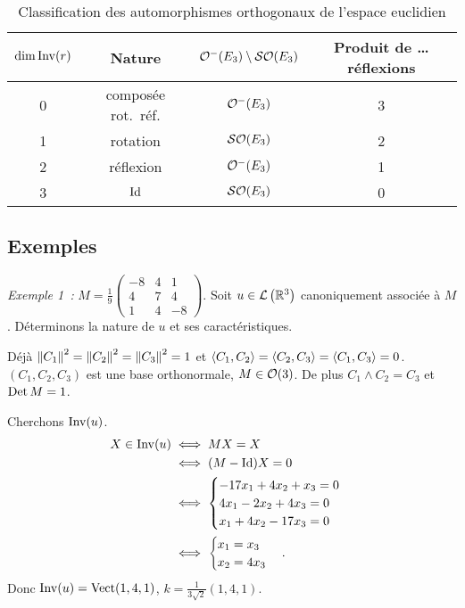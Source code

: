 \begin{table}
  \centering
  \begin{tabular}{|c|c|c|c|}\hline
    \(\operatorname{dim}\operatorname{Inv}(r)\) & Nature & \(\mathcal{O}^{-}\!\left(E_3\right)\setminus\mathcal{SO}\!\left(E_3\right)\) & Produit 
    de \ldots réflexions \\ \hline
    0 & composée rot.\ réf. & \(\mathcal{O}^{-}\!\left(E_3\right)\) & 3 \\
    1 & rotation & \(\mathcal{SO}\!\left(E_3\right)\) & 2 \\
    2 & réflexion & \(\mathcal{O}^{-}\!\left(E_3\right)\) & 1 \\
    3 & \(\operatorname{Id}\) & \(\mathcal{SO}\!\left(E_3\right)\) & 0 \\ \hline
  \end{tabular}
  \caption{Classification des automorphismes orthogonaux de l'espace 
  euclidien}
  \label{tab:classE3}
\end{table}

\subsection{Exemples}

\emph{Exemple 1~:} \(M = \frac{1}{9} \begin{pmatrix} -8 & 4 & 1 \\ 4 & 7 & 4 
\\ 1 & 4 & -8 \end{pmatrix}\). Soit \(u \in \mathcal{L}\left(\mathbb{R}^3\right)\) canoniquement 
associée à \(M\). Déterminons la nature de \(u\) et ses caractéristiques.

Déjà \(\left\lVert C_1\right\rVert^2=\left\lVert C_2\right\rVert^2=\left\lVert C_3\right\rVert^2=1\) et 
\(\left\langle{C_1},{C_2}\right\rangle=\left\langle{C_2},{C_3}\right\rangle=\left\langle{C_1},{C_3}\right\rangle=0\). \((C_1, 
C_2, C_3)\) est une base orthonormale, \(M \in \mathcal{O}\!\left(3\right)\). De plus \(C_1 
\wedge C_2=C_3\) et \(\operatorname{Det} M=1\).

Cherchons \(\operatorname{Inv}(u)\).
\begin{align*}
  X \in \operatorname{Inv}(u) &\iff MX = X \\
  &\iff (M-\operatorname{Id})X =0 \\
  &\iff \begin{cases} -17x_1 +4x_2 +x_3 =0 \\ 4x_1 -2x_2 +4x_3=0 \\ x_1 +4x_2 
  -17 x_3=0 \end{cases}\\
  &\iff \begin{cases} x_1 = x_3 \\ x_2=4x_3 \end{cases}.
\end{align*}
Donc \(\operatorname{Inv}(u) = \operatorname{Vect}(1, 4, 1)\), \(k = \frac{1}{3\sqrt{2}}(1, 4, 
1)\).

